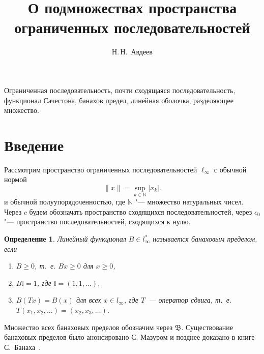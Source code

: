 \documentclass{article}
\theoremstyle{plain}
\newtheorem{definition}{Определение}
\theoremstyle{definition}
\begin{document}

\date{}

\author{Н.\,Н.~Авдеев}
\address{
Воронежский госуниверситет,
г.~Воронеж}




\title{
	О подмножествах пространства ограниченных последовательностей
}



\maketitle
\begin{fulltext}



\begin{keywords}
Ограниченная последовательность,
почти сходящаяся последовательность,
функционал Сачестона,
банахов предел,
линейная оболочка,
разделяющее множество.
\end{keywords}





\section{Введение}

Рассмотрим пространство ограниченных последовательностей $\ell_\infty$ с обычной нормой
\begin{equation*}
	\|x\| = \sup_{k\in\mathbb{N}} |x_k|
	.
\end{equation*}
и обычной полуупорядоченностью, где $\mathbb{N}$ "--- множество натуральных чисел.
Через $c$ будем обозначать пространство сходящихся последовательностей,
через $c_0$ "---  пространство последовательностей, сходящихся к нулю.


\begin{definition}
	Линейный функционал $B\in l_\infty^*$ называется банаховым пределом,
	если
	\begin{enumerate}
		\item
			$B\geq0$, т.~е. $Bx \geq 0$ для $x \geq 0$,
		\item
			$B\mathbb{I}=1$, где $\mathbb{I} =(1,1,\ldots)$,
		\item
			$B(Tx)=B(x)$ для всех $x\in l_\infty$, где $T$~---
		оператор сдвига, т.~е. $T(x_1,x_2,\ldots)=(x_2,x_3,\ldots)$.
	\end{enumerate}
\end{definition}
Множество всех банаховых пределов обозначим через $\mathfrak{B}$.
Существование банаховых пределов было анонсировано С. Мазуром \cite{Mazur} и позднее доказано в книге С.~Банаха~\cite{B}. 



\end{fulltext}
\end{document}
